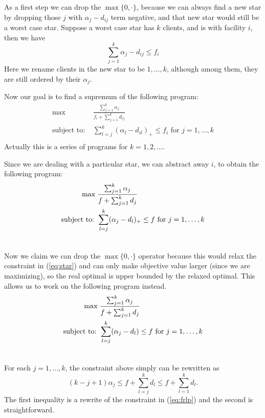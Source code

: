 \documentclass[oneside,final]{ucr}
\begin{document}
As a first step we can drop the $\max\{0, \cdot\}$, because
we can always find a new star by dropping those $j$ with
$\alpha_j - d_{ij}$ term negative, and that new star would
still be a worst case star. Suppose a worst case star has
$k$ clients, and is with facility $i$, then we have
\begin{equation*}
  \sum_{j=1}^k \alpha_j - d_{ij} \leq f_i
\end{equation*}
Here we rename clients in the new star to be $1,\ldots,k$,
although among them, they are still ordered by their
$\alpha_j$.

Now our goal is to find a supremum of the following program:
\begin{align*}
  \max\; & \frac{\sum_{j=1}^k \alpha_j}{f_i + \sum_{j=1}^k d_{ij}}\\
  \textrm{subject to: } & \sum_{l=j}^k (\alpha_l -
  d_{il})_+\leq f_i \textrm{ for } j=1,\ldots,k\\
\end{align*}
Actually this is a series of programs for $k=1,2,\ldots$.

Since we are dealing with a particular star, we can abstract
away $i$, to obtain the following program:
\begin{align}
  \label{eq:star}
  \max\; & \frac{\sum_{j=1}^k \alpha_j}{f + \sum_{j=1}^k
    d_j}\\ \notag
  \textrm{subject to: } & \sum_{l=j}^k (\alpha_j - d_{l})_+
  \leq f \textrm{ for } j=1,\ldots,k\\ \notag
\end{align}

Now we claim we can drop the $\max\{0, \cdot\}$ operator
because this would relax the constraint in (\ref{eq:star})
and can only make objective value larger (since we are
maximizing), so the real optimal is upper bounded by the
relaxed optimal. This allows us to work on the following
program instead.
\begin{align}
  \label{eq:frlp}
  \max\; & \frac{\sum_{j=1}^k \alpha_j}{f + \sum_{j=1}^k
    d_j}\\ \notag
  \textrm{subject to: } & \sum_{l=j}^k (\alpha_j - d_{l})
  \leq f \textrm{ for } j=1,\ldots,k\\ \notag
\end{align}

For each $j=1,\ldots,k$, the constraint above simply can be
rewritten as
\begin{equation}
  (k-j+1) \alpha_j \leq f + \sum_{l=j}^k d_l \leq f +
  \sum_{l=1}^k d_l.
\end{equation}
The first inequality is a rewrite of the constraint in
(\ref{eq:frlp}) and the second is straightforward.
\end{document}
